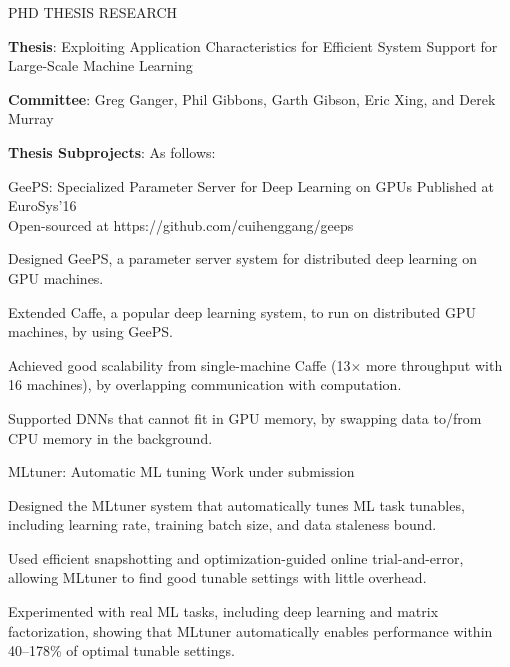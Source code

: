 \documentclass{resume} %
\begin{document}
\begin{rSection}{PHD THESIS RESEARCH}

\hspace{-1em} \textbf{Thesis}: Exploiting Application Characteristics for Efficient System Support for Large-Scale Machine Learning
\vspace{-.1in}
\begin{list}{\enskip\textbullet}{\leftmargin=2em}
\item \textbf{Committee}: Greg Ganger, Phil Gibbons, Garth Gibson, Eric Xing, and Derek Murray
\vspace{-.1in}
\item \textbf{Thesis Subprojects}: As follows:
\end{list}

\begin{rSubsection}{\hspace{-1em} GeePS: Specialized Parameter Server for Deep Learning on GPUs}{}
{Published at EuroSys'16\\
Open-sourced at https://github.com/cuihenggang/geeps}{}
\vspace{-0.3em}
\item Designed GeePS, a parameter server system for distributed deep learning on GPU machines.
\item Extended Caffe, a popular deep learning system, to run on distributed GPU machines, by using GeePS.
\item Achieved good scalability from single-machine Caffe (13$\times$ more throughput with 16 machines), by overlapping communication with computation.
\item Supported DNNs that cannot fit in GPU memory, by swapping data to/from CPU memory in the background.
\end{rSubsection}
\vspace{-.1in}

\begin{rSubsection}{\hspace{-1em} MLtuner: Automatic ML tuning}{}
{Work under submission}{}
\vspace{-0.3em}
\item Designed the MLtuner system that automatically tunes ML task tunables, including learning rate, training batch size, and data staleness bound.
\item Used efficient snapshotting and optimization-guided online trial-and-error, allowing MLtuner to find good tunable settings with little overhead.
\item Experimented with real ML tasks, including deep learning and matrix factorization, showing that MLtuner automatically enables performance within 40--178\% of optimal tunable settings.
\end{rSubsection}
\vspace{-.1in}


\end{rSection}
\end{document}
